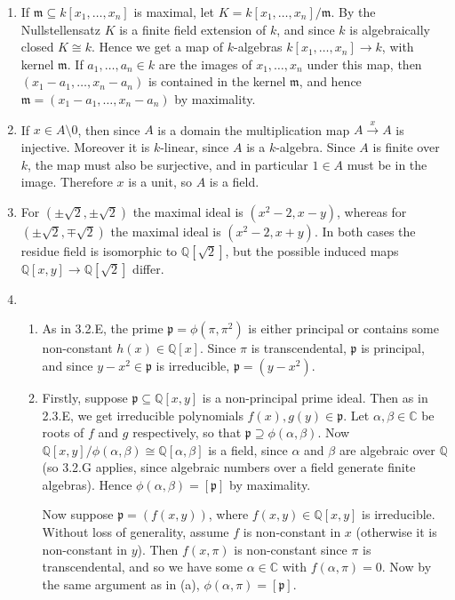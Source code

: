 \documentclass{report}
\newcommand{\m}{\mathfrak{m}}
\newcommand{\p}{\mathfrak{p}}
\newcommand{\Q}{\mathbb{Q}}
\newcommand{\C}{\mathbb{C}}
\begin{document}
\begin{enumerate}[label=\textbf{3.2.\Alph*.}]
	\item If $\m\subseteq k[x_1,\ldots,x_n]$ is maximal, let
	      $K=k[x_1,\ldots,x_n]/\m$. By the Nullstellensatz $K$ is a finite field
	      extension of $k$, and since $k$ is algebraically closed $K\cong k$.
	      Hence we get a map of $k$-algebras $k[x_1,\ldots,x_n]\to k$, with
	      kernel $\m$. If $a_1,\ldots,a_n\in k$ are the images of
	      $x_1,\ldots,x_n$ under this map, then $(x_1-a_1,\ldots,x_n-a_n)$ is
	      contained in the kernel $\m$, and hence $\m=(x_1-a_1,\ldots,x_n-a_n)$
	      by maximality.

	\item If $x\in A\setminus0$, then since $A$ is a domain the multiplication
	      map $A\xrightarrow{x}A$ is injective. Moreover it is $k$-linear, since
	      $A$ is a $k$-algebra. Since $A$ is finite over $k$, the map must also
	      be surjective, and in particular $1\in A$ must be in the image.
	      Therefore $x$ is a unit, so $A$ is a field.

	\item For $(\pm\sqrt2,\pm\sqrt2)$ the maximal ideal is $(x^2-2,x-y)$,
	      whereas for $(\pm\sqrt2,\mp\sqrt2)$ the maximal ideal is $(x^2-2,x+y)$.
	      In both cases the residue field is isomorphic to $\Q[\sqrt2]$, but the
	      possible induced maps $\Q[x,y]\to\Q[\sqrt2]$ differ.

	\item
	      \begin{enumerate}[label=(\alph*)]
		      \item As in 3.2.E, the prime $\p=\phi(\pi,\pi^2)$ is either
		            principal or contains some non-constant $h(x)\in\Q[x]$. Since
		            $\pi$ is transcendental, $\p$ is principal, and since
		            $y-x^2\in\p$ is irreducible, $\p=(y-x^2)$.

		      \item Firstly, suppose $\p\subseteq\Q[x,y]$ is a non-principal
		            prime ideal. Then as in 2.3.E, we get irreducible polynomials
		            $f(x),g(y)\in\p$. Let $\alpha,\beta\in\C$ be roots of $f$ and
		            $g$ respectively, so that $\p\supseteq\phi(\alpha,\beta)$. Now
		            $\Q[x,y]/\phi(\alpha,\beta)\cong\Q[\alpha,\beta]$ is a field,
		            since $\alpha$ and $\beta$ are algebraic over $\Q$ (so 3.2.G
		            applies, since algebraic numbers over a field generate finite
		            algebras). Hence $\phi(\alpha,\beta)=[\p]$ by maximality.

		            Now suppose $\p=(f(x,y))$, where $f(x,y)\in\Q[x,y]$ is
		            irreducible. Without loss of generality, assume $f$ is
		            non-constant in $x$ (otherwise it is non-constant in $y$).
		            Then $f(x,\pi)$ is non-constant since $\pi$ is transcendental,
		            and so we have some $\alpha\in\C$ with $f(\alpha,\pi)=0$. Now
		            by the same argument as in (a), $\phi(\alpha,\pi)=[\p]$.


\end{enumerate}
\end{enumerate}
\end{document}
